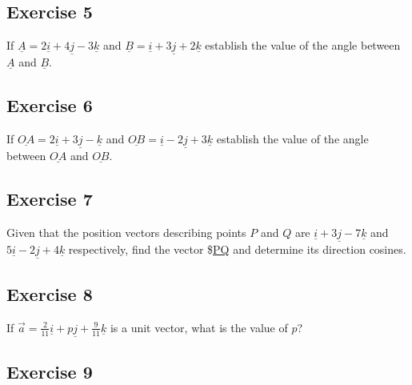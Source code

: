\documentclass[
  11pt,
  oneside]{book}
\newcommand{\slide}{}
\theoremstyle{definition}
\theoremstyle{definition}
\theoremstyle{definition}
\theoremstyle{definition}
\theoremstyle{remark}
\begin{document}
\slide

\subsection*{Exercise 5}\label{exercise-5-7}

If \(\underline A=2\underline{i}+4\underline{j}-3\underline{k}\) and \(\underline B=\underline{i}+3\underline{j}+2\underline{k}\) establish the value of the angle between \(\underline A\) and \(\underline B\).

\slide

\subsection*{Exercise 6}\label{exercise-6-5}

If \(\underline{OA}=2\underline{i}+3\underline{j}-\underline{k}\) and \(\underline{OB}=\underline{i}-2\underline{j}+3\underline{k}\) establish the value of the angle between \(\underline{OA}\) and \(\underline{OB}\).

\slide

\subsection*{Exercise 7}\label{exercise-7-2}

Given that the position vectors describing points \(P\) and \(Q\) are \(\underline{i}+3\underline{j}-7\underline{k}\) and \(5\underline{i}-2\underline{j}+4\underline{k}\) respectively, find the vector \$\underline{PQ} and determine its direction cosines.

\slide

\subsection*{Exercise 8}\label{exercise-8-1}

If \(\vec{a}=\frac2{11}\underline{i}+p\underline{j}+\frac9{11}\underline{k}\) is a unit vector, what is the value of \(p\)?

\slide

\subsection*{Exercise 9}\label{exercise-9-1}
\end{document}
